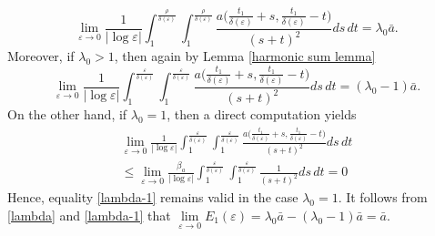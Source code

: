 \documentclass[12pt]{article}
\numberwithin{equation}{section}
\def\e{\varepsilon}
\begin{document}
 \begin{equation}\label{lambda}
     \lim_{\varepsilon\to0}\frac{1}{|\log{\varepsilon}|}\int_{1}^{\frac{\rho}{\delta(\varepsilon)}}\int_{1}^{\frac{\rho}{\delta(\varepsilon)}}\frac{a\big(\frac{t_{1}}{\delta(\varepsilon)}+s,\frac{t_{1}}{\delta(\varepsilon)}-t\big)}{(s+t)^{2}}ds\,dt=\lambda_{0}\bar{a}.
 \end{equation}
Moreover, if $\lambda_{0}>1$, then again by Lemma \ref{harmonic sum lemma}
\begin{equation}\label{lambda-1}
    \lim_{\varepsilon\to0}\frac{1}{|\log{\varepsilon}|}\int_{1}^{\frac{\varepsilon}{\delta(\varepsilon)}}\int_{1}^{\frac{\varepsilon}{\delta(\varepsilon)}}\frac{a\big(\frac{t_{1}}{\delta(\varepsilon)}+s,\frac{t_{1}}{\delta(\varepsilon)}-t\big)}{(s+t)^{2}}ds\,dt=(\lambda_{0}-1)\bar{a}.
\end{equation}
On the other hand, if $\lambda_{0}=1$, then a direct computation yields
\begin{multline*}
    \lim_{\e\to0}\frac{1}{|\log{\varepsilon}|}\int_{1}^{\frac{\varepsilon}{\delta(\varepsilon)}}\int_{1}^{\frac{\varepsilon}{\delta(\varepsilon)}}\frac{a\big(\frac{t_{1}}{\delta(\varepsilon)}+s,\frac{t_{1}}{\delta(\varepsilon)}-t\big)}{(s+t)^{2}}ds\,dt\\
    \le\lim_{\e\to0}\frac{\beta_{a}}{|\log{\varepsilon}|}\int_{1}^{\frac{\varepsilon}{\delta(\varepsilon)}}\int_{1}^{\frac{\varepsilon}{\delta(\varepsilon)}}\frac{1}{(s+t)^{2}}ds\,dt=0
\end{multline*}
Hence, equality \eqref{lambda-1} remains valid in the case $\lambda_{0}=1$. It follows from \eqref{lambda} and \eqref{lambda-1} that $
\lim\limits_{\varepsilon\to0}E_{1}(\varepsilon)=\lambda_{0}\bar{a}-(\lambda_{0}-1)\bar{a}=\bar{a}$.
\end{document}
